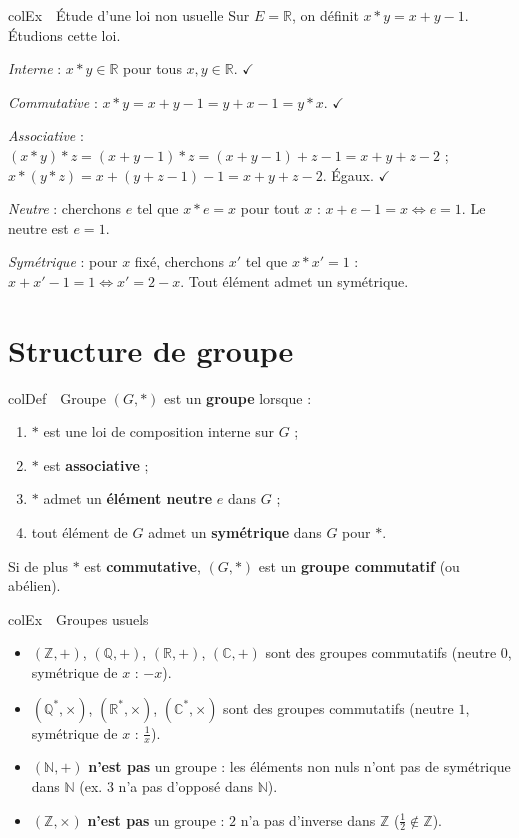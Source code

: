 \documentclass[11pt,a4paper]{article}
\newenvironment{definition}[1][Définition]
  {\begin{fiche}{colDef}{\ding{110}~~#1}}{\end{fiche}}
\newenvironment{exemple}[1][Exemple]
  {\begin{fiche}{colEx}{\ding{217}~~#1}}{\end{fiche}}
\begin{document}
\begin{exemple}[Étude d'une loi non usuelle]
Sur $E=\mathbb{R}$, on définit $x*y=x+y-1$. Étudions cette loi.

\smallskip
\emph{Interne} : $x*y\in\mathbb{R}$ pour tous $x,y\in\mathbb{R}$. $\checkmark$

\smallskip
\emph{Commutative} : $x*y=x+y-1=y+x-1=y*x$. $\checkmark$

\smallskip
\emph{Associative} : $(x*y)*z=(x+y-1)*z=(x+y-1)+z-1=x+y+z-2$ ; $x*(y*z)=x+(y+z-1)-1=x+y+z-2$. Égaux. $\checkmark$

\smallskip
\emph{Neutre} : cherchons $e$ tel que $x*e=x$ pour tout $x$ : $x+e-1=x\iff e=1$. Le neutre est $e=1$.

\smallskip
\emph{Symétrique} : pour $x$ fixé, cherchons $x'$ tel que $x*x'=1$ : $x+x'-1=1\iff x'=2-x$. Tout élément admet un symétrique.
\end{exemple}

\section{Structure de groupe}

\begin{definition}[Groupe]
$(G,*)$ est un \textbf{groupe} lorsque :
\begin{enumerate}[leftmargin=7mm, itemsep=0.5mm]
  \item $*$ est une loi de composition interne sur $G$ ;
  \item $*$ est \textbf{associative} ;
  \item $*$ admet un \textbf{élément neutre} $e$ dans $G$ ;
  \item tout élément de $G$ admet un \textbf{symétrique} dans $G$ pour $*$.
\end{enumerate}
Si de plus $*$ est \textbf{commutative}, $(G,*)$ est un \textbf{groupe commutatif} (ou abélien).
\end{definition}

\begin{exemple}[Groupes usuels]
\begin{itemize}[leftmargin=6mm, itemsep=0.5mm]
  \item $(\mathbb{Z},+)$, $(\mathbb{Q},+)$, $(\mathbb{R},+)$, $(\mathbb{C},+)$ sont des groupes commutatifs (neutre $0$, symétrique de $x$ : $-x$).
  \item $(\mathbb{Q}^*,\times)$, $(\mathbb{R}^*,\times)$, $(\mathbb{C}^*,\times)$ sont des groupes commutatifs (neutre $1$, symétrique de $x$ : $\frac1x$).
  \item $(\mathbb{N},+)$ \textbf{n'est pas} un groupe : les éléments non nuls n'ont pas de symétrique dans $\mathbb{N}$ (ex. $3$ n'a pas d'opposé dans $\mathbb{N}$).
  \item $(\mathbb{Z},\times)$ \textbf{n'est pas} un groupe : $2$ n'a pas d'inverse dans $\mathbb{Z}$ ($\frac12\notin\mathbb{Z}$).
\end{itemize}
\end{exemple}
\end{document}
